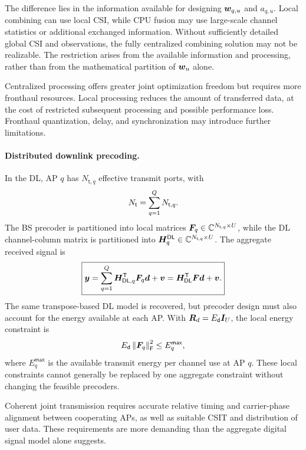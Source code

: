 The difference lies in the information available for designing $\bm{w}_{q,u}$ and $a_{q,u}$. Local combining can use local CSI, while CPU fusion may use large-scale channel statistics or additional exchanged information. Without sufficiently detailed global CSI and observations, the fully centralized combining solution may not be realizable. The restriction arises from the available information and processing, rather than from the mathematical partition of $\bm{w}_u$ alone.

Centralized processing offers greater joint optimization freedom but requires more fronthaul resources. Local processing reduces the amount of transferred data, at the cost of restricted subsequent processing and possible performance loss. Fronthaul quantization, delay, and synchronization may introduce further limitations.

\paragraph{Distributed downlink precoding.}
In the DL, AP $q$ has $N_{\mathsf t,q}$ effective transmit ports, with
\begin{equation*}
	N_{\mathsf{t}}=\sum_{q=1}^{Q}N_{\mathsf t,q}.
\end{equation*}
The BS precoder is partitioned into local matrices $\bm{F}_q\in\mathbb{C}^{N_{\mathsf t,q}\times U}$, while the DL channel-column matrix is partitioned into $\bm{H}_q^{\mathsf{DL}}\in\mathbb{C}^{N_{\mathsf t,q}\times U}$. The aggregate received signal is
\begin{equation}
	\boxed{
		\bm{y}=\sum_{q=1}^{Q}
		{\bm{H}}^{\mathsf{T}}_{\mathsf{DL},q}\bm{F}_q\bm{d}+\bm{v}
		={\bm{H}}^{\mathsf{T}}_{\mathsf{DL}}\bm{F}\bm{d}+\bm{v}.
	}
	\label{eq:distributed-dl-05}
\end{equation}
The same transpose-based DL model is recovered, but precoder design must also account for the energy available at each AP. With $\bm{R}_d=E_{\mathsf{d}}\bm{I}_U$, the local energy constraint is
\begin{equation}
	E_{\mathsf{d}}\left\|\bm{F}_q\right\|_{\mathsf{F}}^2\leq E_q^{\mathsf{max}},
	\label{eq:apenergy-05}
\end{equation}
where $E_q^{\mathsf{max}}$ is the available transmit energy per channel use at AP $q$. These local constraints cannot generally be replaced by one aggregate constraint without changing the feasible precoders.

Coherent joint transmission requires accurate relative timing and carrier-phase alignment between cooperating APs, as well as suitable CSIT and distribution of user data. These requirements are more demanding than the aggregate digital signal model alone suggests.

